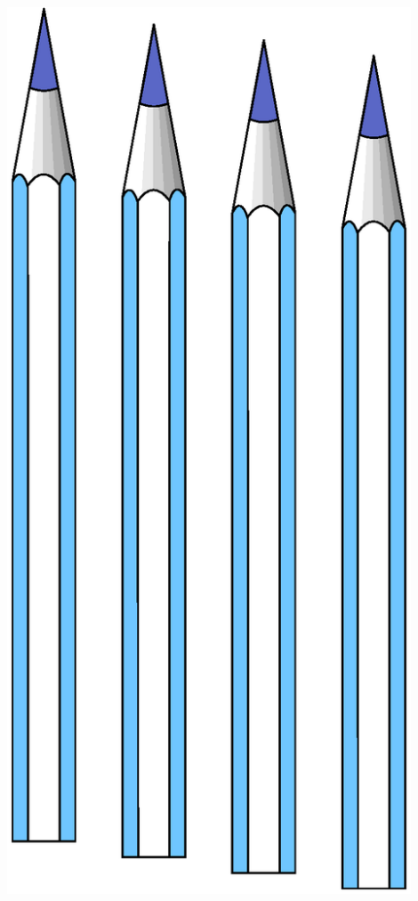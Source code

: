 \documentclass[\mydriver,12pt,twoside,notitlepage,a4paper]{article}
\begin{document}
\begin{titlepage}
\begin{center}
  \centerline{\includegraphics[angle=-90,width=0.9\textwidth]{pencils}}




\end{center}
\end{titlepage}
\end{document}
